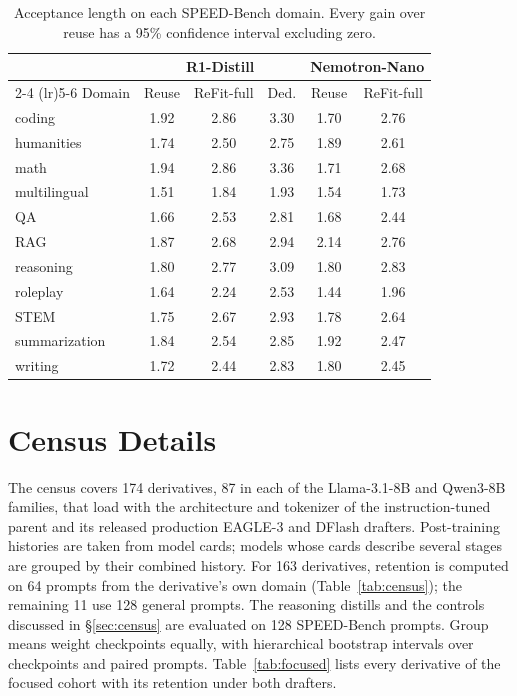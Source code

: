 \documentclass[11pt]{article}
\newcommand{\refitF}{ReFit-full}
\begin{document}
\begin{table}[!h]
  \centering
  \small
  \setlength{\tabcolsep}{3.0pt}
  \begin{tabular}{@{}lccccc@{}}
    \toprule
    & \multicolumn{3}{c}{R1-Distill} & \multicolumn{2}{c}{Nemotron-Nano} \\
    \cmidrule(lr){2-4} \cmidrule(lr){5-6}
    Domain & Reuse & \refitF{} & Ded. & Reuse & \refitF{} \\
    \midrule
    coding & 1.92 & 2.86 & 3.30 & 1.70 & 2.76 \\
    humanities & 1.74 & 2.50 & 2.75 & 1.89 & 2.61 \\
    math & 1.94 & 2.86 & 3.36 & 1.71 & 2.68 \\
    multilingual & 1.51 & 1.84 & 1.93 & 1.54 & 1.73 \\
    QA & 1.66 & 2.53 & 2.81 & 1.68 & 2.44 \\
    RAG & 1.87 & 2.68 & 2.94 & 2.14 & 2.76 \\
    reasoning & 1.80 & 2.77 & 3.09 & 1.80 & 2.83 \\
    roleplay & 1.64 & 2.24 & 2.53 & 1.44 & 1.96 \\
    STEM & 1.75 & 2.67 & 2.93 & 1.78 & 2.64 \\
    summarization & 1.84 & 2.54 & 2.85 & 1.92 & 2.47 \\
    writing & 1.72 & 2.44 & 2.83 & 1.80 & 2.45 \\
    \bottomrule
  \end{tabular}
  \caption{Acceptance length on each SPEED-Bench domain. Every gain over reuse has a 95\% confidence interval excluding zero.}
  \label{tab:domains}
\end{table}

\section{Census Details}
\label{app:census}

The census covers 174 derivatives, 87 in each of the Llama-3.1-8B and Qwen3-8B families, that load with the architecture and tokenizer of the instruction-tuned parent and its released production EAGLE-3 and DFlash drafters.
Post-training histories are taken from model cards; models whose cards describe several stages are grouped by their combined history.
For 163 derivatives, retention is computed on 64 prompts from the derivative's own domain (Table~\ref{tab:census}); the remaining 11 use 128 general prompts.
The reasoning distills and the controls discussed in \S\ref{sec:census} are evaluated on 128 SPEED-Bench prompts.
Group means weight checkpoints equally, with hierarchical bootstrap intervals over checkpoints and paired prompts.
Table~\ref{tab:focused} lists every derivative of the focused cohort with its retention under both drafters.
\end{document}
